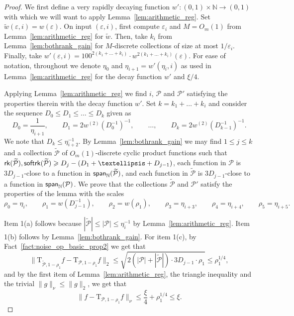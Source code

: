 \documentclass[10pt,a4paper]{amsart}
\newcommand\card[1]{\left| {#1} \right|}
\newcommand\norm[1]{\| #1 \|}
\newcommand\spn{{\sf span}_{\mathbb{N}}}
\newcommand\eps{\varepsilon}
\renewcommand\geq{\geqslant}
\renewcommand\leq{\leqslant}
\begin{document}
\begin{proof}
     We first define a very rapidly decaying function $w'\colon (0,1)\times\mathbb{N}\to (0,1)$ with which we will want to apply Lemma~\ref{lem:arithmetic_reg}.
    Set $\tilde{w}(\eps,i) = w(\eps)$. On input $(\eps,i)$, first compute $\eps_i$ and $M = O_{m}(1)$ from Lemma~\ref{lem:arithmetic_reg} for $\tilde{w}$. 
    Then, take $k_i$ from Lemma~\ref{lem:bothrank_gain} for $M$-discrete collections of size at most $1/\eps_i$. Finally, take $w'(\eps,i) = 100^{2(k_1+\ldots+k_i)}\cdot w^{2(k_1+\ldots+k_i)}(\eps)$. For ease of notation,  throughout we denote $\eta_0$ and $\eta_{i+1} = w'(\eta_i,i)$ as used in Lemma~\ref{lem:arithmetic_reg} for the decay function $w'$ and $\xi/4$.
    
    Applying Lemma~\ref{lem:arithmetic_reg} we find $i$, $\mathcal{P}$ and $\mathcal{P}'$ satisfying the properties therein with the decay function $w'$. Set $k=k_1+\ldots+k_i$ and consider the sequence 
    $D_0 \leq D_1 \leq \ldots\leq D_k$ given as 
    \[
    D_0 = \frac{1}{\eta_{i+1}},
    \qquad
    D_1 = 2w^{(2)}(D_0^{-1})^{-1},
    \qquad
    \ldots,
    \qquad
    D_{k} = 2w^{(2)}(D_{k-1}^{-1})^{-1}.
    \]
    We note that $D_{k}\leq \eta_{i+2}^{-1}$.
    By Lemma~\ref{lem:bothrank_gain} we may find $1\leq j\leq k$ and a collection $\widetilde{\mathcal{P}}$ of $O_{m}(1)$-discrete cyclic product functions such that
    ${\sf rk}(\widetilde{\mathcal{P}}),{\sf softrk}(\widetilde{\mathcal{P}})\geq D_{j}-(D_1+\ldots+D_{j-1})$, each function in $\mathcal{P}$ is $3D_{j-1}$-close to a function in $\spn(\widetilde{\mathcal{P}})$, and each function in $\widetilde{\mathcal{P}}$ 
    is $3D_{j-1}$-close to a function in $\spn(\mathcal{P})$. We prove that the collections $\widetilde{\mathcal{P}}$ and $\mathcal{P}'$ satisfy the properties of the lemma with the scales 
    \[
\rho_0=\eta_i,\qquad
\rho_1=w(D_{j-1}^{-1}),\qquad
\rho_2=w(\rho_1),\qquad
\rho_3=\eta_{i+3},\qquad
\rho_4=\eta_{i+4},\qquad
\rho_5=\eta_{i+5}.
\]
    
    
    Item 1(a) follows because 
    $|\widetilde{\mathcal{P}}|\leq \card{\mathcal{P}}\leq \eta_{i}^{-1}$ by Lemma~\ref{lem:arithmetic_reg}. Item 1(b) follows by Lemma~\ref{lem:bothrank_gain}.  For item 1(c), by Fact~\ref{fact:noise_op_basic_prop2} we get that
    \begin{equation}\label{eq:reg_with_rank}
    \norm{\mathrm{T}_{\widetilde{\mathcal{P}},1-\rho_1}f-\mathrm{T}_{\mathcal{P},1-\rho_1}f}_2
    \leq 
    \sqrt{2(\card{\mathcal{P}}+|\widetilde{\mathcal{P}}|)\cdot 3D_{j-1}\cdot \rho_1}
    \leq \rho_1^{1/4},
    \end{equation}
    and by the first item of Lemma~\ref{lem:arithmetic_reg}, the triangle inequality and the trivial $\|g\|_{\nu}\leq \norm{g}_2$, we get that
    \[
    \norm{f-\mathrm{T}_{\mathcal{P},1-\rho_1}f}_{\nu}\leq \frac{\xi}{4}+\rho_1^{1/4}
    \leq \xi.
    \]
    

\end{proof}
\end{document}
